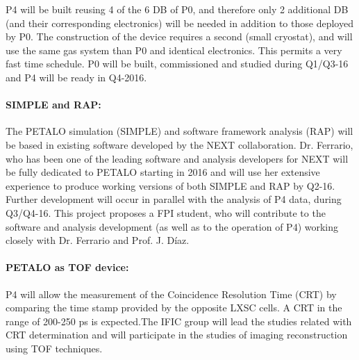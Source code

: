 
P4 will be built reusing 4 of the 6 DB of P0, and therefore only 2 additional DB (and their corresponding electronics) will be needed in addition to those deployed by P0. The construction of the device requires a second (small cryostat), and will use the same gas system than P0 and identical electronics. This permits a very fast time schedule. P0 will be built, commissioned and studied during Q1/Q3-16 and P4 will be ready in Q4-2016. 

% 

\paragraph{SIMPLE and RAP:}
The PETALO simulation (SIMPLE) and software framework analysis (RAP) will be based in existing software developed by the NEXT collaboration. Dr. Ferrario, who has been one of the leading software and analysis developers for NEXT will be fully dedicated to PETALO starting in 2016 and will use her extensive experience to produce working versions of both SIMPLE and RAP by Q2-16. Further development will occur in parallel with the analysis of P4 data, during Q3/Q4-16. This project proposes a FPI student, who will contribute to the software and analysis development (as well as to the operation of P4) working closely with Dr. Ferrario and Prof. J. Díaz.

\paragraph{PETALO as TOF device:}
P4 will allow the measurement of the Coincidence Resolution Time (CRT) by comparing the time stamp provided by the opposite LXSC cells. A CRT in the range of 200-250 ps is expected.The IFIC group will lead the studies related with CRT determination and will participate in the studies of imaging reconstruction using TOF techniques. 

